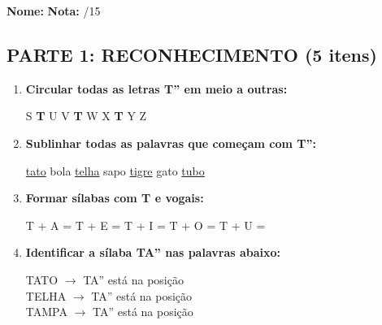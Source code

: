 \begin{exercicio}

\noindent\textbf{Nome:} \underline{\hspace{4cm}} \quad \textbf{Nota:} \underline{\hspace{1cm}}/15

\subsection*{PARTE 1: RECONHECIMENTO (5 itens)}

\begin{enumerate}
  \item \textbf{Circular todas as letras T'' em meio a outras:}
  \begin{center}
  S \quad \textbf{T} \quad U \quad V \quad \textbf{T} \quad W \quad X \quad \textbf{T} \quad Y \quad Z
  \end{center}

  \item \textbf{Sublinhar todas as palavras que começam com T'':}
  \begin{center}
  \uline{tato} \quad bola \quad \uline{telha} \quad sapo \quad \uline{tigre} \quad gato \quad \uline{tubo}
  \end{center}

  \item \textbf{Formar sílabas com T e vogais:}
  \begin{center}
  T + A = \underline{\hspace{1.5cm}} \quad T + E = \underline{\hspace{1.5cm}} \quad T + I = \underline{\hspace{1.5cm}} \quad T + O = \underline{\hspace{1.5cm}} \quad T + U = \underline{\hspace{1.5cm}}
  \end{center}

  \item \textbf{Identificar a sílaba TA'' nas palavras abaixo:}
  \begin{center}
  TATO $\rightarrow$ TA'' está na posição \underline{\hspace{1cm}} \\
  TELHA $\rightarrow$ TA'' está na posição \underline{\hspace{1cm}} \\
  TAMPA $\rightarrow$ TA'' está na posição \underline{\hspace{1cm}}
  \end{center}


\end{enumerate}
\end{exercicio}
